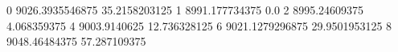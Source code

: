 0 9026.3935546875 35.2158203125
1 8991.177734375 0.0
2 8995.24609375 4.068359375
4 9003.9140625 12.736328125
6 9021.1279296875 29.9501953125
8 9048.46484375 57.287109375
